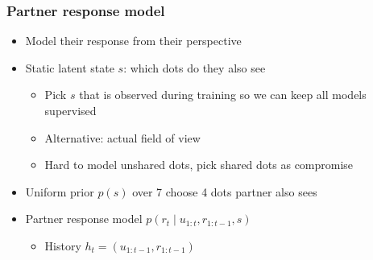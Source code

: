 \documentclass{beamer}
\begin{document}
\begin{frame}
\frametitle{Partner response model}
\begin{itemize}
\item Model their response from their perspective
\item Static latent state $s$: which dots do they also see
    \begin{itemize}
    \item Pick $s$ that is observed during training so we can keep
        all models supervised
    \item Alternative: actual field of view
    \item Hard to model unshared dots, pick shared dots as compromise
    \end{itemize}
\item Uniform prior $p(s)$ over 7 choose 4 dots partner also sees
\item Partner response model $p(r_t \mid u_{1:t},r_{1:t-1}, s)$
    \begin{itemize}
    \item History $h_t = (u_{1:t-1}, r_{1:t-1})$
    \end{itemize}
\begin{center}
\end{center}
\end{itemize}
\end{frame}
\end{document}
